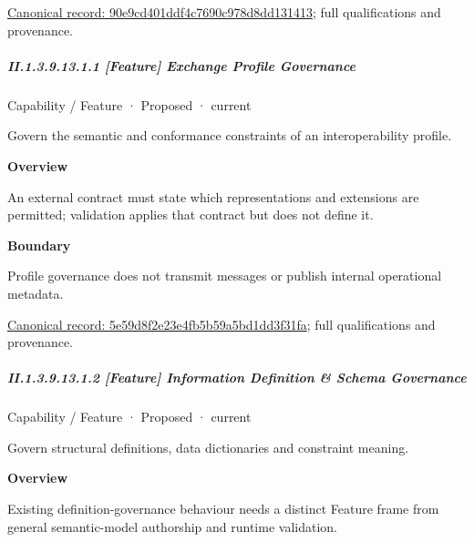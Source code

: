 {\footnotesize \href{../../../../../../../continuum/strategy/capability/90e9cd401ddf4c7690c978d8dd131413.md}{Canonical record: 90e9cd401ddf4c7690c978d8dd131413}; full qualifications and provenance.}\par
\subparagraph*{II.1.3.9.13.1.1 [Feature] Exchange Profile Governance}
\label{navigation:II.1.3.9.13.1.1}

\label{element:5e59d8f2e23e4fb5b59a5bd1dd3f31fa}
{\small Capability / Feature · Proposed · current}\par

Govern the semantic and conformance constraints of an interoperability profile.



\textbf{Overview}



An external contract must state which representations and extensions are permitted; validation applies that contract but does not define it.



\textbf{Boundary}



Profile governance does not transmit messages or publish internal operational metadata.


{\footnotesize \href{../../../../../../../continuum/strategy/capability/feature/5e59d8f2e23e4fb5b59a5bd1dd3f31fa.md}{Canonical record: 5e59d8f2e23e4fb5b59a5bd1dd3f31fa}; full qualifications and provenance.}\par
\subparagraph*{II.1.3.9.13.1.2 [Feature] Information Definition \& Schema Governance}
\label{navigation:II.1.3.9.13.1.2}

\label{element:3317bbb7e2db4384abf44a50bf67422c}
{\small Capability / Feature · Proposed · current}\par

Govern structural definitions, data dictionaries and constraint meaning.



\textbf{Overview}



Existing definition-governance behaviour needs a distinct Feature frame from general semantic-model authorship and runtime validation.



